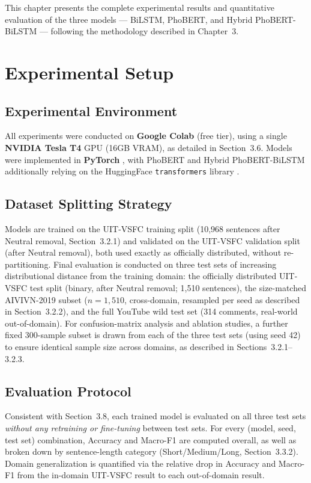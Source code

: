 \documentclass[12pt]{report} %
\begin{document}
This chapter presents the complete experimental results and quantitative evaluation of the three models --- BiLSTM, PhoBERT, and Hybrid PhoBERT-BiLSTM --- following the methodology described in Chapter~3.

\section{Experimental Setup}

\subsection{Experimental Environment}
All experiments were conducted on \textbf{Google Colab} (free tier), using a single \textbf{NVIDIA Tesla T4} GPU (16GB VRAM), as detailed in Section~3.6. Models were implemented in \textbf{PyTorch} \cite{paszke2019pytorch}, with PhoBERT and Hybrid PhoBERT-BiLSTM additionally relying on the HuggingFace \texttt{transformers} library \cite{wolf2020transformers}.

\subsection{Dataset Splitting Strategy}
Models are trained on the UIT-VSFC training split (10,968 sentences after Neutral removal, Section~3.2.1) and validated on the UIT-VSFC validation split (after Neutral removal), both used exactly as officially distributed, without re-partitioning. Final evaluation is conducted on three test sets of increasing distributional distance from the training domain: the officially distributed UIT-VSFC test split (binary, after Neutral removal; 1,510 sentences),
the size-matched AIVIVN-2019 subset ($n = 1{,}510$, cross-domain, resampled per seed as described in Section~3.2.2),
and the full YouTube wild test set (314 comments, real-world out-of-domain).
For confusion-matrix analysis and ablation studies, a further fixed 300-sample subset is drawn from each of the three test sets (using seed 42) to ensure identical sample size across domains, as described in Sections~3.2.1--3.2.3.
\subsection{Evaluation Protocol}
Consistent with Section~3.8, each trained model is evaluated on all three test sets \textit{without any retraining or fine-tuning} between test sets. For every (model, seed, test set) combination, Accuracy and Macro-F1 are computed overall, as well as broken down by sentence-length category (Short/Medium/Long, Section~3.3.2). Domain generalization is quantified via the relative drop in Accuracy and Macro-F1 from the in-domain UIT-VSFC result to each out-of-domain result.
\end{document}
